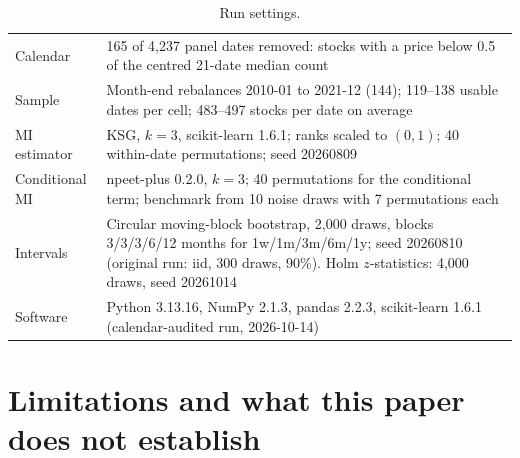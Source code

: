\documentclass[11pt]{article}
\begin{document}
\begin{table}[h]
\centering\small
\caption{Run settings.}
\label{tab:repro}
\begin{tabularx}{\textwidth}{lX}
\toprule
Calendar & 165 of 4,237 panel dates removed: stocks with a price below 0.5 of the centred 21-date median count \\
Sample & Month-end rebalances 2010-01 to 2021-12 (144); 119--138 usable dates per cell; 483--497 stocks per date on average \\
MI estimator & KSG, $k=3$, scikit-learn 1.6.1; ranks scaled to $(0,1)$; 40 within-date permutations; seed 20260809 \\
Conditional MI & npeet-plus 0.2.0, $k=3$; 40 permutations for the conditional term; benchmark from 10 noise draws with 7 permutations each \\
Intervals & Circular moving-block bootstrap, 2,000 draws, blocks 3/3/3/6/12 months for 1w/1m/3m/6m/1y; seed 20260810 (original run: iid, 300 draws, 90\%). Holm $z$-statistics: 4,000 draws, seed 20261014 \\
Software & Python 3.13.16, NumPy 2.1.3, pandas 2.2.3, scikit-learn 1.6.1 (calendar-audited run, 2026-10-14) \\
\bottomrule
\end{tabularx}
\end{table}

\section{Limitations and what this paper does not establish}
\end{document}

